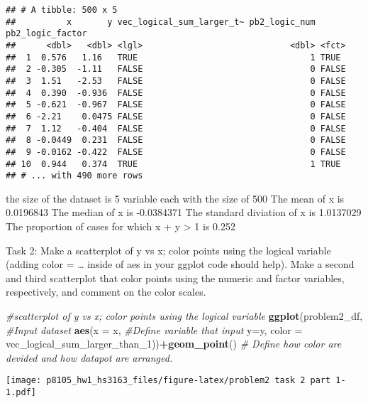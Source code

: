 \documentclass[]{article}
\newenvironment{Shaded}{\begin{snugshade}}{\end{snugshade}}
\newcommand{\CommentTok}[1]{\textcolor[rgb]{0.56,0.35,0.01}{\textit{#1}}}
\newcommand{\DataTypeTok}[1]{\textcolor[rgb]{0.13,0.29,0.53}{#1}}
\newcommand{\DecValTok}[1]{\textcolor[rgb]{0.00,0.00,0.81}{#1}}
\newcommand{\KeywordTok}[1]{\textcolor[rgb]{0.13,0.29,0.53}{\textbf{#1}}}
\newcommand{\NormalTok}[1]{#1}
\newcommand{\OperatorTok}[1]{\textcolor[rgb]{0.81,0.36,0.00}{\textbf{#1}}}
\begin{document}
\begin{verbatim}
## # A tibble: 500 x 5
##          x       y vec_logical_sum_larger_t~ pb2_logic_num pb2_logic_factor
##      <dbl>   <dbl> <lgl>                             <dbl> <fct>           
##  1  0.576   1.16   TRUE                                  1 TRUE            
##  2 -0.305  -1.11   FALSE                                 0 FALSE           
##  3  1.51   -2.53   FALSE                                 0 FALSE           
##  4  0.390  -0.936  FALSE                                 0 FALSE           
##  5 -0.621  -0.967  FALSE                                 0 FALSE           
##  6 -2.21    0.0475 FALSE                                 0 FALSE           
##  7  1.12   -0.404  FALSE                                 0 FALSE           
##  8 -0.0449  0.231  FALSE                                 0 FALSE           
##  9 -0.0162 -0.422  FALSE                                 0 FALSE           
## 10  0.944   0.374  TRUE                                  1 TRUE            
## # ... with 490 more rows
\end{verbatim}

the size of the dataset is 5 variable each with the size of 500 The mean
of x is 0.0196843 The median of x is -0.0384371 The standard diviation
of x is 1.0137029 The proportion of cases for which x + y \textgreater{}
1 is 0.252

Task 2: Make a scatterplot of y vs x; color points using the logical
variable (adding color = \ldots{} inside of aes in your ggplot code
should help). Make a second and third scatterplot that color points
using the numeric and factor variables, respectively, and comment on the
color scales.

\begin{Shaded}
\begin{Highlighting}[]
\CommentTok{#scatterplot of y vs x; color points using the logical variable}
\KeywordTok{ggplot}\NormalTok{(problem2_df, }\CommentTok{#Input dataset}
       \KeywordTok{aes}\NormalTok{(}\DataTypeTok{x =}\NormalTok{ x, }\CommentTok{#Define variable that input}
           \DataTypeTok{y=}\NormalTok{y,}
           \DataTypeTok{color =}\NormalTok{ vec_logical_sum_larger_than_}\DecValTok{1}\NormalTok{))}\OperatorTok{+}\KeywordTok{geom_point}\NormalTok{() }\CommentTok{# Define how color are devided and how datapot are arranged.}
\end{Highlighting}
\end{Shaded}

\texttt{[image: p8105\_hw1\_hs3163\_files/figure-latex/problem2 task 2 part 1-1.pdf]}
\end{document}

